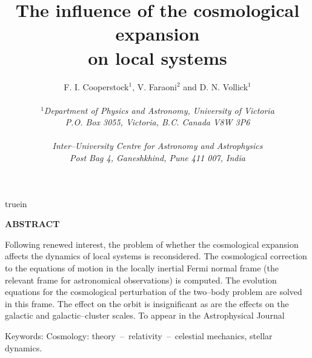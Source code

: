 

  \oddsidemargin 0pt
   truein
  
  \def\theequation{\arabic{section}.\arabic{equation}} 
  \newcommand{\be}{\begin{equation}}
  \newcommand{\ee}{\end{equation}}
  \begin{titlepage}
  \title{The influence of the cosmological expansion \\ on local systems}
  \author{F. I. Cooperstock$^1$, V. Faraoni$^2$  and D. N. Vollick$^1$\\ 
          \\{\small \it $^1$Department of Physics and Astronomy,
University 
  of Victoria} \\
  {\small \it P.O. Box 3055, Victoria, B.C. Canada V8W 3P6 }\\\\
{\small \it Inter--University Centre for Astronomy and Astrophysics}\\
{\small \it Post Bag 4, Ganeshkhind, Pune 411 007, India}}
  \date{%
  } %
  \maketitle
  \thispagestyle{empty}
  \end{titlepage}  \clearpage
  \begin{center} {\bf ABSTRACT} \end{center}
  
  Following renewed interest, the problem of whether the cosmological 
  expansion affects
  the dynamics of local systems is reconsidered. The cosmological correction to
  the equations of motion in the locally inertial Fermi normal frame (the 
  relevant frame for
  astronomical observations) is computed. The evolution equations for the
  cosmological perturbation of the two--body problem are solved in this frame.
  The effect on the orbit is insignificant as are the effects on the galactic
  and galactic--cluster scales.
  \vspace*{1truecm}
  To appear in the Astrophysical Journal

  \vspace*{1truecm}
  \vspace*{0.5truecm}  \begin{center}  Keywords: Cosmology: 
  theory~--~relativity~--~celestial mechanics, stellar dynamics. \end{center}
  \clearpage
  
